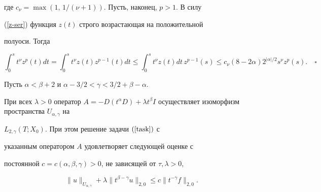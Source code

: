 где $c_\nu =\max(1,\,1/(\nu+1))$. Пусть, наконец, $p>1$. В силу


(\ref{z-ser}) функция $z(t)$ строго возрастающая на положительной


полуоси. Тогда


$$


\int_0^s t^\nu z^p(t) d t =


\int_0^s t^\nu z(t)z^{p-1}(t) d t \le


\int_0^s t^\nu z(t) d t\, z^{p-1}(s) \le


c_\nu (8-2\alpha)2^{|\alpha|/2} s^\nu z^p(s).\quad\square


$$





\begin{thms}\label{lambda}


Пусть $\alpha < \beta+2$ и $\alpha-3/2<\gamma<3/2+\beta-\alpha$.


При всех $\lambda > 0$ оператор $A=-D(t^\alpha D)+\lambda t^\beta


I$ осуществляет изоморфизм пространства $U_{\alpha,\gamma}$ на


$L_{2,\gamma}(T;X_0)$. При этом решение задачи $(\ref{task})$ с


указанным оператором $A$ удовлетворяет следующей оценке с


постоянной $c=c(\alpha,\beta,\gamma)>0$, не зависящей от $\tau,


\lambda > 0$,


\begin{equation}\label{uneq-lambda}


\|u\|_{U_{\alpha,\gamma}} +\lambda \|t^{\beta-\gamma} u\|_{2,0}\le c


\|t^{-\gamma}f\|_{2,0}.


\end{equation}


\end{thms}





